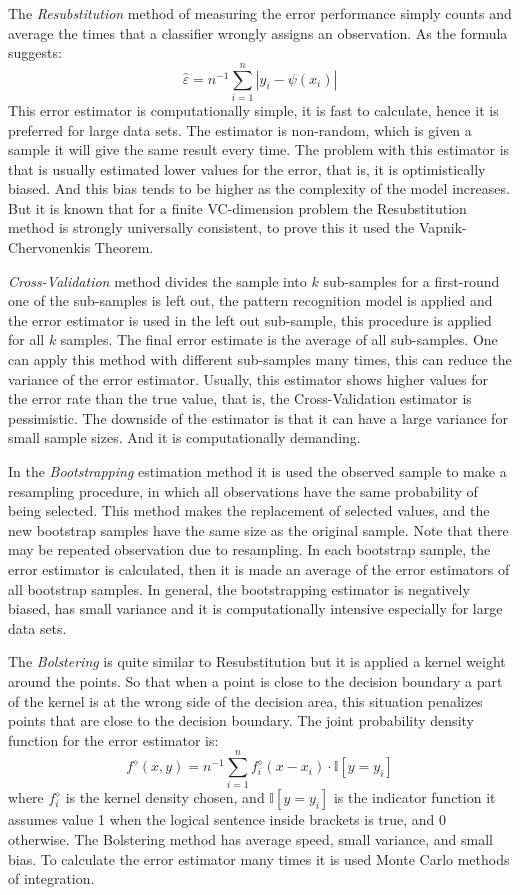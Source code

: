 \documentclass[9pt,a4paper]{article}
\begin{document}
The \textit{Resubstitution} method of measuring the error performance simply counts and average the times that a classifier wrongly assigns an observation. As the formula suggests:
$$ \hat{\varepsilon} = n^{-1} \sum\limits_{i=1}^{n} | y_i  - \psi(x_i)   |      $$
This error estimator is computationally simple, it is fast to calculate, hence it is preferred for large data sets. The estimator is non-random, which is given a sample it will give the same result every time. The problem with this estimator is that is usually estimated lower values for the error, that is, it is optimistically biased. And this bias tends to be higher as the complexity of the model increases. But it is known that for a finite VC-dimension problem the Resubstitution method is strongly universally consistent, to prove this it used the Vapnik-Chervonenkis Theorem.  

\textit{Cross-Validation} method divides the sample into $k$ sub-samples for a first-round one of the sub-samples is left out, the pattern recognition model is applied and the error estimator is used in the left out sub-sample, this procedure is applied for all $k$ samples. The final error estimate is the average of all sub-samples.
One can apply this method with different sub-samples many times, this can reduce the variance of the error estimator. Usually, this estimator shows higher values for the error rate than the true value, that is, the Cross-Validation estimator is pessimistic. The downside of the estimator is that it can have a large variance for small sample sizes. And it is computationally demanding. 

In the \textit{Bootstrapping} estimation method it is used the observed sample to make a resampling procedure, in which all observations have the same probability of being selected. This method makes the replacement of selected values, and the new bootstrap samples have the same size as the original sample. Note that there may be repeated observation due to resampling. In each bootstrap sample, the error estimator is calculated, then it is made an average of the error estimators of all bootstrap samples. In general, the bootstrapping estimator is negatively biased, has small variance and it is computationally intensive especially for large data sets.

The \textit{Bolstering}  is quite similar to Resubstitution but it is applied a kernel weight around the points. So that when a point is close to the decision boundary a part of the kernel is at the wrong side of the decision area, this situation penalizes points that are close to the decision boundary.  The joint probability density function for the error estimator is:
$$  f^{\diamond} (x,y) = n^{-1} \sum \limits_{i=1}^{n} f^{\diamond}_{i} (x - x_i) \cdot \mathbb{I}[y=y_i]  $$
where $f^{\diamond}_{i} $ is the kernel density chosen, and $ \mathbb{I}[y=y_i] $ is the indicator function it assumes value 1 when the logical sentence inside brackets is true, and 0 otherwise. The Bolstering method has average speed, small variance, and small bias. To calculate the error estimator many times it is used Monte Carlo methods of integration. 
\end{document}
